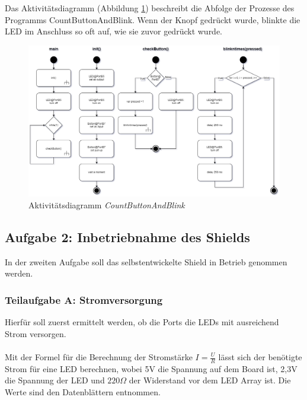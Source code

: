 \documentclass{article}
\begin{document}
\noindent Das Aktivitätsdiagramm (Abbildung \ref{fig:ad-a1}) beschreibt die Abfolge der Prozesse des Programms CountButtonAndBlink. Wenn der Knopf gedrückt wurde, blinkte die LED im Anschluss so oft auf, wie sie zuvor gedrückt wurde. 

\begin{figure}[ht]
    \centering
    \includegraphics[width=\textwidth]{images/A1-AD.png}
    \caption{Aktivitätsdiagramm \textit{CountButtonAndBlink}}
    \label{fig:ad-a1}
\end{figure}

\subsection{Aufgabe 2: Inbetriebnahme des Shields}

\noindent In der zweiten Aufgabe soll das selbstentwickelte Shield in Betrieb genommen werden.

\subsubsection{Teilaufgabe A: Stromversorgung}

\noindent Hierfür soll zuerst ermittelt werden, ob die Ports die LEDs mit ausreichend Strom versorgen.\\

\\
\noindent Mit der Formel für die Berechnung der Stromstärke \(I = \frac{U}{R}\) lässt sich der benötigte Strom für eine LED berechnen, wobei 5V die Spannung auf dem Board ist, 2,3V die Spannung der LED und \(220  \Omega\) der Widerstand vor dem LED Array ist. Die Werte sind den Datenblättern \cite{AtmelDatasheet,Kingbright} entnommen.
\end{document}
